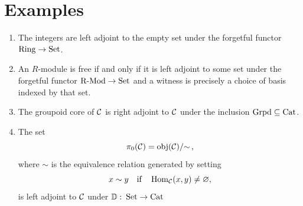     \section{Examples}
        \begin{enumerate}[label=\roman*)]
            \item 
                The integers are left adjoint to the empty set under the forgetful functor $\operatorname{Ring} \to \operatorname{Set}$.
            \item 
                An $R$-module is free if and only if it is left adjoint to some set under the forgetful functor $\operatorname{R-Mod} \to \operatorname{Set}$ and a witness is precisely a choice of basis indexed by that set.
            \item 
                The groupoid core of $\mathcal{C}$ is right adjoint to $\mathcal{C}$ under the inclusion $\operatorname{Grpd} \subseteq \operatorname{Cat}$.
            \item 
                The set
                \begin{equation*}
                    \pi_0(\mathcal{C}) = \operatorname{obj}(\mathcal{C})/{\sim} \,,
                \end{equation*}
                where $\sim$ is the equivalence relation generated by setting
                \begin{equation*}
                    x \sim y \quad \text{if} \quad \operatorname{Hom}_{\mathcal{C}}(x, y) \neq \varnothing ,
                \end{equation*}
                is left adjoint to $\mathcal{C}$ under $\mathbb{D} \,\colon \operatorname{Set} \to \operatorname{Cat}$
        \end{enumerate}
        
